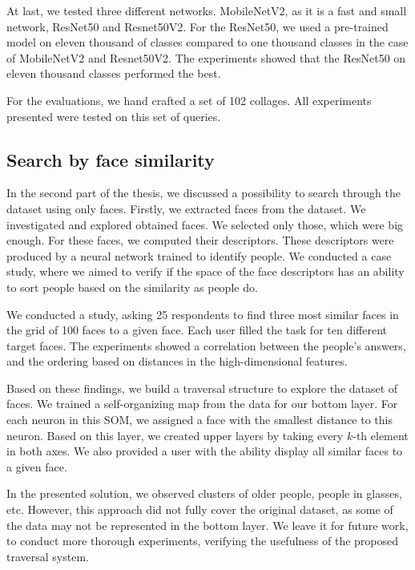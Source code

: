 At last, we tested three different networks. MobileNetV2, as it is a fast and small network, ResNet50 and Resnet50V2. For the ResNet50, we used a pre-trained model on eleven thousand of classes compared to one thousand classes in the case of MobileNetV2 and Resnet50V2. The experiments showed that the ResNet50 on eleven thousand classes performed the best.

For the evaluations, we hand crafted a set of 102 collages. All experiments presented were tested on this set of queries.

\subsection*{Search by face similarity}

In the second part of the thesis, we discussed a possibility to search through the dataset using only faces. Firstly, we extracted faces from the dataset. We investigated and explored obtained faces. We selected only those, which were big enough. For these faces, we computed their descriptors. These descriptors were produced by a neural network trained to identify people. We conducted a case study, where we aimed to verify if the space of the face descriptors has an ability to sort people based on the similarity as people do.

We conducted a study, asking 25 respondents to find three most similar faces in the grid of 100 faces to a given face. Each user filled the task for ten different target faces. The experiments showed a correlation between the people's answers, and the ordering based on distances in the high-dimensional features.

Based on these findings, we build a traversal structure to explore the dataset of faces. We trained a self-organizing map from the data for our bottom layer. For each neuron in this SOM, we assigned a face with the smallest distance to this neuron. Based on this layer, we created upper layers by taking every $k$-th element in both axes. We also provided a user with the ability display all similar faces  to a given face.

In the presented solution, we observed clusters of older people, people in glasses, etc. However, this approach did not fully cover the original dataset, as some of the data may not be represented in the bottom layer. We leave it for future work, to conduct more thorough experiments, verifying the usefulness of the proposed traversal system.

\vspace{1em}

